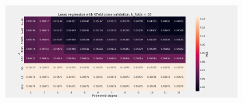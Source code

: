 \begin{figure}[H]
    \centering
    \includegraphics[width=0.8\textwidth]{Figures/f_lasso_kfold_n_10.png}
\end{figure}



 







